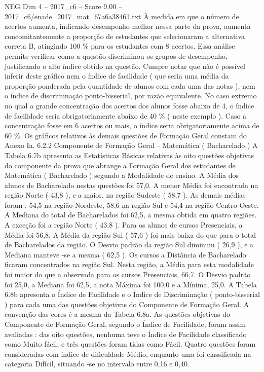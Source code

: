\begin{textsample}{NEG Dim 4 – 2017\_c6 – Score 9.00 – 2017\_c6/enade\_2017\_mat\_67a6a38461.txt}
À medida em que o número de acertos aumenta, indicando desempenho melhor nessa parte da prova, aumenta concomitantemente a proporção de estudantes que selecionaram a alternativa correta B, atingindo 100 \% para os estudantes com 8 acertos.
Essa análise permite verificar como a questão discriminou os grupos de desempenho, justificando o alto índice obtido na questão.
Cumpre notar que não é possível inferir deste gráfico nem o índice de facilidade ( que seria uma média da proporção ponderada pela quantidade de alunos com cada uma das notas ), nem o índice de discriminação ponto-bisserial, por razão equivalente.
No caso extremo no qual a grande concentração dos acertos dos alunos fosse abaixo de 4, o índice de facilidade seria obrigatoriamente abaixo de 40 \% ( neste exemplo ).
Caso a concentração fosse em 6 acertos ou mais, o índice seria obrigatoriamente acima de 60 \%.
Os gráficos relativos às demais questões de Formação Geral constam do Anexo Ia. 6.2.2 Componente de Formação Geral – Matemática ( Bacharelado ) A Tabela 6.7b apresenta as Estatísticas Básicas relativas às oito questões objetivas do componente da prova que abrange a Formação Geral dos estudantes de Matemática ( Bacharelado ) segundo a Modalidade de ensino.
A Média dos alunos de Bacharelado nestas questões foi 57,0.
A menor Média foi encontrada na região Norte ( 43,8 ), e a maior, na região Sudeste ( 58,7 ).
As demais médias foram : 54,5 na região Nordeste, 58,6 na região Sul e 54,4 na região Centro-Oeste.
A Mediana do total de Bacharelados foi 62,5, a mesma obtida em quatro regiões.
A exceção foi a região Norte ( 43,8 ).
Para os alunos de cursos Presenciais, a Média foi 56,8.
A Média da região Sul ( 57,6 ) foi mais baixa do que para o total de Bacharelados da região.
O Desvio padrão da região Sul diminuiu ( 26,9 ), e a Mediana manteve -se a mesma ( 62,5 ).
Os cursos a Distância de Bacharelado ficaram concentrados na região Sul.
Nesta região, a Média para esta modalidade foi maior do que a observada para os cursos Presenciais, 66,7.
O Desvio padrão foi 25,0, a Mediana foi 62,5, a nota Máxima foi 100,0 e a Mínima, 25,0.
A Tabela 6.8b apresenta o Índice de Facilidade e o Índice de Discriminação ( ponto-bisserial ) para cada uma das questões objetivas do Componente de Formação Geral.
A convenção das cores é a mesma da Tabela 6.8a.
As questões objetivas do Componente de Formação Geral, segundo o Índice de Facilidade, foram assim avaliadas : das oito questões, nenhuma teve o Índice de Facilidade classificado como Muito fácil, e três questões foram tidas como Fácil.
Quatro questões foram consideradas com índice de dificuldade Médio, enquanto uma foi classificada na categoria Difícil, situando -se no intervalo entre 0,16 e 0,40.

\end{textsample}

